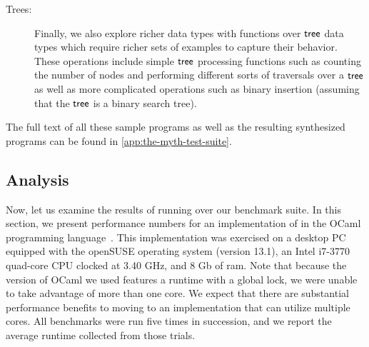 \begin{description}
  \item[Trees:]
    Finally, we also explore richer data types with functions over $\mathsf{tree}$ data types which require richer sets of examples to capture their behavior.
    These operations include simple $\mathsf{tree}$ processing functions such as counting the number of nodes and performing different sorts of traversals over a $\mathsf{tree}$ as well as more complicated operations such as binary insertion (assuming that the $\mathsf{tree}$ is a binary search tree).
\end{description}

The full text of all these sample \myth{} programs as well as the resulting synthesized programs can be found in \autoref{app:the-myth-test-suite}.

\subsection{Analysis}
\label{subsec:analysis}

Now, let us examine the results of running \myth{} over our benchmark suite.
In this section, we present performance numbers for an implementation of \myth{} in the OCaml programming language~.
This implementation was exercised on a desktop PC equipped with the openSUSE operating system (version 13.1), an Intel i7-3770 quad-core CPU clocked at 3.40 GHz, and 8 Gb of ram.
Note that because the version of OCaml we used features a runtime with a global lock, we were unable to take advantage of more than one core.
We expect that there are substantial performance benefits to moving to an implementation that can utilize multiple cores.
All benchmarks were run five times in succession, and we report the average runtime collected from those trials.




